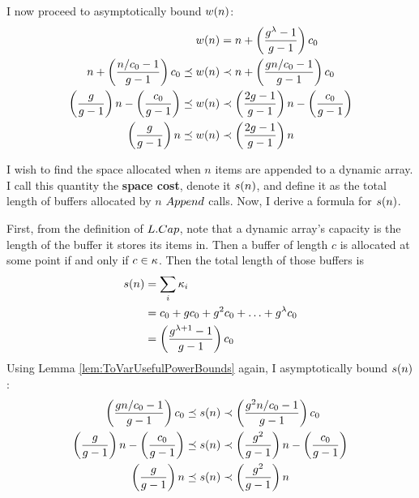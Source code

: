 I now proceed to asymptotically bound $w(n)$:
\begin{align*}
w(n) &= n + \left( \frac{g^\lambda - 1}{g - 1} \right) c_0\\
n + \left( \frac{n / c_0 - 1}{g - 1} \right) c_0 \preceq w(n) &\prec n + \left( \frac{g{n} / c_0 - 1}{g - 1} \right) c_0\\
\left( \frac{g}{g - 1} \right) n - \left( \frac{c_0}{g - 1} \right) \preceq w(n) &\prec \left( \frac{2g - 1}{g - 1} \right) n - \left( \frac{c_0}{g - 1} \right)\\
\left( \frac{g}{g - 1} \right) n \preceq w(n) &\prec \left( \frac{2g - 1}{g - 1} \right) n
\end{align*}
\HdrSpaceComplex

I wish to find the space allocated when $n$ items are appended to a dynamic array. I call this quantity the \textbf{space cost}, denote it $s(n)$, and define it as the total length of buffers allocated by $n$ $Append$ calls. Now, I derive a formula for $s(n)$.

First, from the definition of $L.Cap$, note that a dynamic array's capacity is the length of the buffer it stores its items in. Then a buffer of length $c$ is allocated at some point if and only if $c \in \kappa$. Then the total length of those buffers is
\begin{align*}
s(n) &= \sum_i {\kappa_i}\\
&= c_0 + gc_0 + g^2c_0 + \ldots + g^\lambda c_0\\
&= \left( \frac{g^{\lambda + 1} - 1}{g - 1} \right) c_0
\end{align*}
Using Lemma \ref{lem:ToVarUsefulPowerBounds} again, I asymptotically bound $s(n)$:
\begin{align*}
\left( \frac{g{n} / c_0 - 1}{g - 1} \right) c_0 \preceq s(n) &\prec \left( \frac{g^2{n} / c_0 - 1}{g - 1} \right) c_0\\
\left( \frac{g}{g - 1} \right) n - \left( \frac{c_0}{g - 1} \right) \preceq s(n) &\prec \left( \frac{g^2}{g - 1} \right) n - \left( \frac{c_0}{g - 1} \right)\\
\left( \frac{g}{g - 1} \right) n \preceq s(n) &\prec \left( \frac{g^2}{g - 1} \right) n
\end{align*}